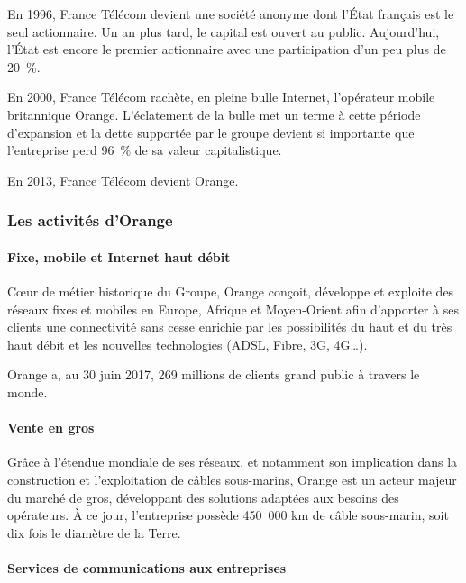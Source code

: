         En 1996, France Télécom devient une société anonyme dont l’État français est le seul actionnaire.
        Un an plus tard, le capital est ouvert au public.
        Aujourd’hui, l’État est encore le premier actionnaire avec une participation d’un peu plus de 20 \%.

        En 2000, France Télécom rachète, en pleine bulle Internet, l’opérateur mobile britannique Orange.
        L’éclatement de la bulle met un terme à cette période d’expansion et la dette supportée par le groupe devient si importante que l’entreprise perd 96 \% de sa valeur capitalistique.

        En 2013, France Télécom devient Orange.

        \subsubsection{Les activités d'Orange}

            \paragraph{Fixe, mobile et Internet haut débit}

            Cœur de métier historique du Groupe, Orange conçoit, développe et exploite des réseaux fixes et mobiles en Europe, Afrique et Moyen-Orient afin d’apporter à ses clients une connectivité sans cesse enrichie par les possibilités du haut et du très haut débit et les nouvelles technologies (ADSL, Fibre, 3G, 4G…).

            Orange a, au 30 juin 2017, 269 millions de clients grand public à travers le monde.

            \paragraph{Vente en gros}

            Grâce à l’étendue mondiale de ses réseaux, et notamment son implication dans la construction et l’exploitation de câbles sous-marins, Orange est un acteur majeur du marché de gros, développant des solutions adaptées aux besoins des opérateurs.
            À ce jour, l’entreprise possède 450 000 km de câble sous-marin, soit dix fois le diamètre de la Terre.

            \paragraph{Services de communications aux entreprises}

